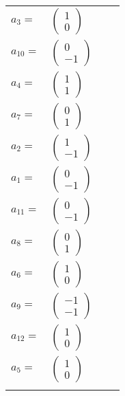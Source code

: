 \documentclass[1p]{elsarticle_modified}
\theoremstyle{definition}
\begin{document}
\begin{tabular}{m{7pt} m{180pt} m{7pt} m{180pt} }
\flushright $a_{3}=$&$\begin{pmatrix}1\\0\end{pmatrix}$ \\
\flushright $a_{10}=$&$\begin{pmatrix}0\\-1\end{pmatrix}$ \\
\flushright $a_{4}=$&$\begin{pmatrix}1\\1\end{pmatrix}$ \\
\flushright $a_{7}=$&$\begin{pmatrix}0\\1\end{pmatrix}$ \\
\flushright $a_{2}=$&$\begin{pmatrix}1\\-1\end{pmatrix}$ \\
\flushright $a_{1}=$&$\begin{pmatrix}0\\-1\end{pmatrix}$ \\
\flushright $a_{11}=$&$\begin{pmatrix}0\\-1\end{pmatrix}$ \\
\flushright $a_{8}=$&$\begin{pmatrix}0\\1\end{pmatrix}$ \\
\flushright $a_{6}=$&$\begin{pmatrix}1\\0\end{pmatrix}$ \\
\flushright $a_{9}=$&$\begin{pmatrix}-1\\-1\end{pmatrix}$ \\
\flushright $a_{12}=$&$\begin{pmatrix}1\\0\end{pmatrix}$ \\
\flushright $a_{5}=$&$\begin{pmatrix}1\\0\end{pmatrix}$\\&\end{tabular}
\end{document}
